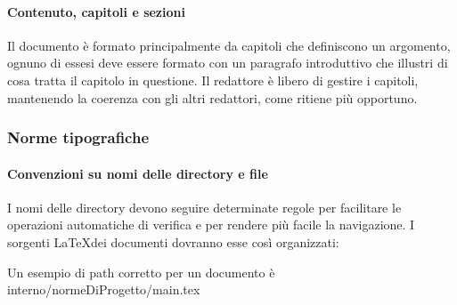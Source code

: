 \paragraph{Contenuto, capitoli e sezioni}
Il documento è formato principalmente da capitoli che definiscono un argomento,
ognuno di essesi deve essere formato con un paragrafo introduttivo che illustri
di cosa tratta il capitolo in questione.
Il redattore è libero di gestire i capitoli, mantenendo la coerenza con gli altri
redattori, come ritiene più opportuno.
\subsubsection{Norme tipografiche}
\paragraph{Convenzioni su nomi delle directory e file}
I nomi delle directory devono seguire determinate regole per facilitare le operazioni
automatiche di verifica e per rendere più facile la navigazione.
I sorgenti \LaTeX \space dei documenti dovranno esse così organizzati:


Un esempio di path corretto per un documento è interno/normeDiProgetto/main.tex
